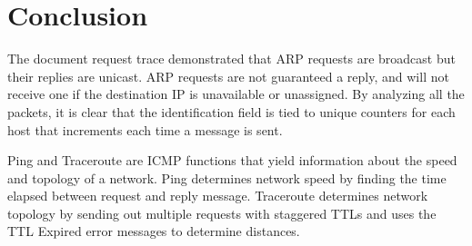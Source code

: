 \pagebreak
\section{Conclusion}\label{sec:conclusion}
The document request trace demonstrated that ARP requests are broadcast but their replies are unicast. ARP requests are not guaranteed a reply, and will not receive one if the destination IP is unavailable or unassigned. By analyzing all the packets, it is clear that the identification field is tied to unique counters for each host that increments each time a message is sent. 

Ping and Traceroute are ICMP functions that yield information about the speed and topology of a network. Ping determines network speed by finding the time elapsed between request and reply message. Traceroute determines network topology by sending out multiple requests with staggered TTLs and uses the TTL Expired error messages to determine distances.
